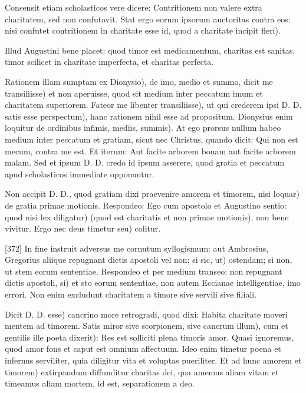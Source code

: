 Consensit etiam scholasticos vere dicere: Contritionem non valere extra charitatem, sed non confutavit. Stat ergo eorum ipsorum auctoritas contra eos: nisi confutet contritionem in charitate esse id, quod a charitate incipit fieri).

Illud Augustini bene placet: quod timor est medicamentum, charitas est sanitas, timor scilicet in charitate imperfecta, et charitas perfecta.

Rationem illam sumptam ex Dionysio), de imo, medio et summo, dicit me transiliisse) et non aperuisse, quod sit medium inter peccatum imum et charitatem superiorem. Fateor me libenter transiliisse), ut qui crederem ipsi D. D. satis esse perspectum), hanc rationem nihil esse ad propositum. Dionysius enim loquitur de ordinibus infimis, mediis, summis). At ego prorsus nullum habeo medium inter peccatum et gratiam, sicut nec Christus, quando dicit: Qui non est mecum, contra me est. Et iterum: Aut facite arborem bonam aut facite arborem malam. Sed et ipsum D. D. credo id ipsum asserere, quod gratia et peccatum apud scholasticos immediate opponuntur.

Non accipit D. D., quod gratiam dixi praevenire amorem et timorem, nisi loquar) de gratia primae motionis. Respondeo: Ego cum apostolo et Augustino sentio: quod nisi lex diligatur) (quod est charitatis et non primae motionis), non bene vivitur. Ergo nec deus timetur seu) colitur.

[372] In fine instruit adversus me cornutum syllogismum: aut Ambrosius, Gregorius aliique repugnant dictis apostoli vel non; si sic, ut) ostendam; si non, ut stem eorum sententiae. Respondeo et per medium transeo: non repugnant dictis apostoli, si) et sto eorum sententiae, non autem Eccianae intelligentiae, imo errori. Non enim excludunt charitatem a timore sive servili sive filiali.

Dicit D. D. esse) cancrino more retrogradi, quod dixi: Habita charitate moveri mentem ad timorem. Satis miror sive scorpionem, sive cancrum illum), cum et gentilis ille poeta dixerit): Res est solliciti plena timoris amor. Quasi ignoremus, quod amor fons et caput est omnium affectuum. Ideo enim timetur poena et infernus serviliter, quia diligitur vita et voluptas pueriliter. Et ad hunc amorem et timorem) extirpandum diffunditur charitas dei, qua amemus aliam vitam et timeamus aliam mortem, id est, separationem a deo.

